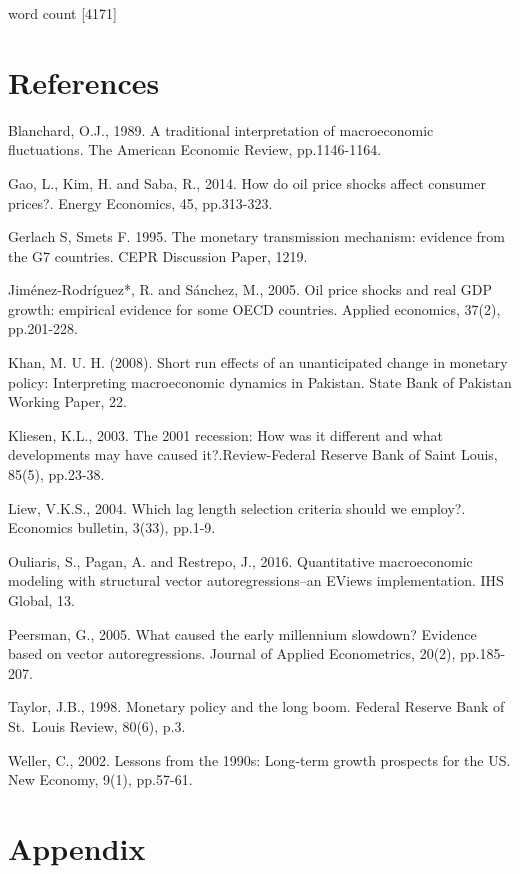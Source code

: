\documentclass[11pt,preprint, authoryear]{elsarticle}
\numberwithin{equation}{section}
\numberwithin{figure}{section}
\numberwithin{table}{section}
\begin{document}
word count {[}4171{]}

\newpage

\hypertarget{references}{%
\section*{References}\label{references}}

Blanchard, O.J., 1989. A traditional interpretation of macroeconomic
fluctuations. The American Economic Review, pp.1146-1164.

Gao, L., Kim, H. and Saba, R., 2014. How do oil price shocks affect
consumer prices?. Energy Economics, 45, pp.313-323.

Gerlach S, Smets F. 1995. The monetary transmission mechanism: evidence
from the G7 countries. CEPR Discussion Paper, 1219.

Jiménez-Rodríguez*, R. and Sánchez, M., 2005. Oil price shocks and real
GDP growth: empirical evidence for some OECD countries. Applied
economics, 37(2), pp.201-228.

Khan, M. U. H. (2008). Short run effects of an unanticipated change in
monetary policy: Interpreting macroeconomic dynamics in Pakistan. State
Bank of Pakistan Working Paper, 22.

Kliesen, K.L., 2003. The 2001 recession: How was it different and what
developments may have caused it?.Review-Federal Reserve Bank of Saint
Louis, 85(5), pp.23-38.

Liew, V.K.S., 2004. Which lag length selection criteria should we
employ?. Economics bulletin, 3(33), pp.1-9.

Ouliaris, S., Pagan, A. and Restrepo, J., 2016. Quantitative
macroeconomic modeling with structural vector autoregressions--an EViews
implementation. IHS Global, 13.

Peersman, G., 2005. What caused the early millennium slowdown? Evidence
based on vector autoregressions. Journal of Applied Econometrics, 20(2),
pp.185-207.

Taylor, J.B., 1998. Monetary policy and the long boom. Federal Reserve
Bank of St.~Louis Review, 80(6), p.3.

Weller, C., 2002. Lessons from the 1990s: Long‐term growth prospects for
the US. New Economy, 9(1), pp.57-61.

\hypertarget{appendix}{%
\section*{Appendix}\label{appendix}}
\end{document}
